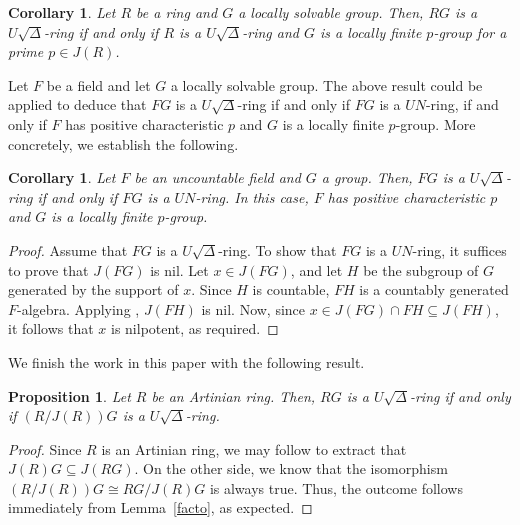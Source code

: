 \documentclass[11pt]{amsart}
\newtheorem{proposition}[theorem]{Proposition}
\newtheorem{corollary}[theorem]{Corollary}
\theoremstyle{definition}
\begin{document}
\begin{corollary}\label{loc}
Let $R$ be a ring and $G$ a locally solvable group. Then, $RG$ is a $U\sqrt{\Delta}$-ring if and only if $R$ is a $U\sqrt{\Delta}$-ring and $G$ is a locally finite $p$-group for a prime $p \in J(R)$.
\end{corollary}


Let $F$ be a field and let $G$ a locally solvable group. The above result could be applied to deduce that $FG$ is a $U\sqrt{\Delta}$-ring if and only if $FG$ is a $UN$-ring, if and only if $F$ has positive characteristic $p$ and $G$ is a locally finite $p$-group. More concretely, we establish the following.

\begin{corollary}
Let $F$ be an uncountable field and $G$ a group. Then, $FG$ is a $U\sqrt{\Delta}$-ring if and only if $FG$ is a $UN$-ring. In this case, $F$ has positive characteristic $p$ and $G$ is a locally finite $p$-group.
\end{corollary}

\begin{proof}
Assume that $FG$ is a $U\sqrt{\Delta}$-ring. To show that $FG$ is a $UN$-ring, it suffices to prove that $J(FG)$ is nil. Let $x \in J(FG)$, and let $H$ be the subgroup of $G$ generated by the support of $x$. Since $H$ is countable, $FH$ is a countably generated $F$-algebra. Applying \cite[Corollary~4.21]{lafc}, $J(FH)$ is nil. Now, since $x \in J(FG) \cap FH \subseteq J(FH)$, it follows that $x$ is nilpotent, as required.
\end{proof}

We finish the work in this paper with the following result.

\begin{proposition}
Let $R$ be an Artinian ring. Then, $RG$ is a $U\sqrt{\Delta}$-ring if and only if $(R/J(R))G$ is a $U\sqrt{\Delta}$-ring.
\end{proposition}

\begin{proof}
Since $R$ is an Artinian ring, we may follow \cite[Proposition 3]{con} to extract that $J(R)G\subseteq J(RG)$. On the other side, we know that the isomorphism $(R/J(R))G\cong RG/J(R)G$ is always true. Thus, the outcome follows immediately from Lemma~\ref{facto}, as expected.
\end{proof}

\end{document}
